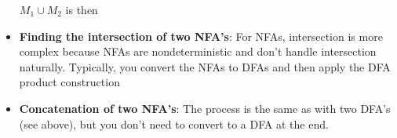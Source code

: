 \documentclass{report}
\begin{document}
\begin{itemize}
\begin{figure}[ht]
            \centering
            \label{fig:machine10}
        \end{figure}
        \bigbreak \noindent 
        $M_1 \cup M_2$ is then
        \begin{figure}[ht]
            \centering
            \label{fig:machine11}
        \end{figure}
        \pagebreak \bigbreak \noindent 
    \item \textbf{Finding the intersection of two NFA's}: 
        For NFAs, intersection is more complex because NFAs are nondeterministic and don’t handle intersection naturally. Typically, you convert the NFAs to DFAs and then apply the DFA product construction
    \item \textbf{Concatenation of two NFA's}: The process is the same as with two DFA's (see above), but you don't need to convert to a DFA at the end.

\end{itemize}
\end{document}
